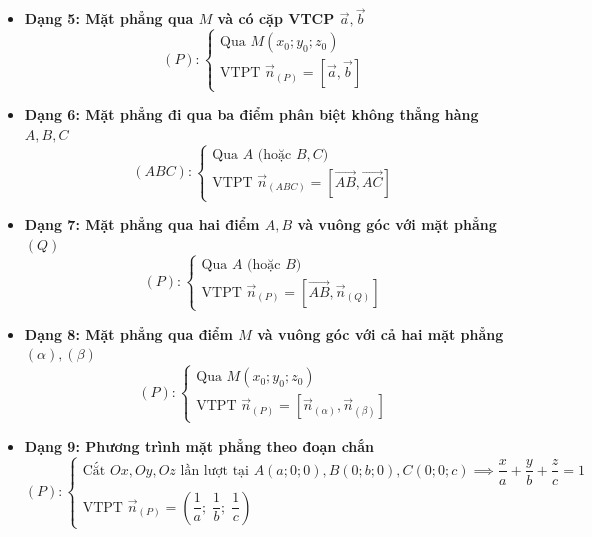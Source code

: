 \documentclass[12pt,a4paper]{article}
\begin{document}
\begin{theorybox}
\begin{itemize}
        \item \textbf{Dạng 5: Mặt phẳng qua $M$ và có cặp VTCP $\vec{a}, \vec{b}$}
        \[
            (P)\colon \begin{cases} \text{Qua } M(x_0; y_0; z_0) \\ \text{VTPT } \vec{n}_{(P)} = [\vec{a}, \vec{b}] \end{cases}
        \]

        \item \textbf{Dạng 6: Mặt phẳng đi qua ba điểm phân biệt không thẳng hàng $A, B, C$}
        \[
            (ABC)\colon \begin{cases} \text{Qua } A \text{ (hoặc } B, C\text{)} \\ \text{VTPT } \vec{n}_{(ABC)} = [\vec{AB}, \vec{AC}] \end{cases}
        \]

        \item \textbf{Dạng 7: Mặt phẳng qua hai điểm $A, B$ và vuông góc với mặt phẳng $(Q)$}
        \[
            (P)\colon \begin{cases} \text{Qua } A \text{ (hoặc } B\text{)} \\ \text{VTPT } \vec{n}_{(P)} = [\vec{AB}, \vec{n}_{(Q)}] \end{cases}
        \]

        \item \textbf{Dạng 8: Mặt phẳng qua điểm $M$ và vuông góc với cả hai mặt phẳng $(\alpha), (\beta)$}
        \[
            (P)\colon \begin{cases} \text{Qua } M(x_0; y_0; z_0) \\ \text{VTPT } \vec{n}_{(P)} = [\vec{n}_{(\alpha)}, \vec{n}_{(\beta)}] \end{cases}
        \]

        \item \textbf{Dạng 9: Phương trình mặt phẳng theo đoạn chắn}
        \[
            (P)\colon \begin{cases} \text{Cắt } Ox, Oy, Oz \text{ lần lượt tại } A(a; 0; 0), B(0; b; 0), C(0; 0; c) \implies \dfrac{x}{a} + \dfrac{y}{b} + \dfrac{z}{c} = 1 \\[5pt] \text{VTPT } \vec{n}_{(P)} = \left(\dfrac{1}{a};\; \dfrac{1}{b};\; \dfrac{1}{c}\right) \end{cases}
        \]
    \end{itemize}
\end{theorybox}

\newpage

\end{document}
